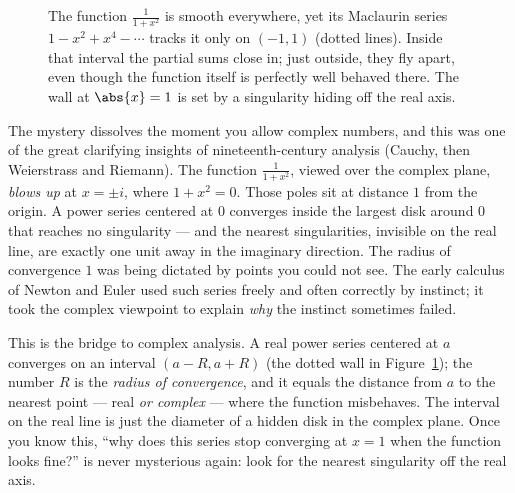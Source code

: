 \begin{figure}[H]
\centering
{}
\caption{The function $\frac{1}{1+x^2}$ is smooth everywhere, yet its Maclaurin series
$1-x^2+x^4-\cdots$ tracks it only on $(-1,1)$ (dotted lines). Inside that interval the
partial sums close in; just outside, they fly apart, even though the function itself is
perfectly well behaved there. The wall at $\abs{x}=1$ is set by a singularity hiding off
the real axis.}
\label{ch31:fig-geometric}
\end{figure}

\begin{historybox}
The mystery dissolves the moment you allow complex numbers, and this was one of the
great clarifying insights of nineteenth-century analysis (Cauchy, then
Weierstrass and Riemann). The function $\frac{1}{1+x^2}$, viewed over the complex
plane, \emph{blows up} at $x = \pm i$, where $1 + x^2 = 0$. Those poles sit at
distance $1$ from the origin. A power series centered at $0$ converges inside the
largest disk around $0$ that reaches no singularity --- and the nearest singularities,
invisible on the real line, are exactly one unit away in the imaginary direction. The
radius of convergence $1$ was being dictated by points you could not see. The early
calculus of Newton and Euler used such series freely and often correctly by
instinct; it took the complex viewpoint to explain \emph{why} the instinct sometimes
failed.
\end{historybox}

\begin{connectionbox}
This is the bridge to complex analysis. A real power series centered at $a$ converges
on an interval $(a-R, a+R)$ (the dotted wall in Figure~\ref{ch31:fig-geometric});
the number $R$ is the \emph{radius of convergence}, and
it equals the distance from $a$ to the nearest point --- real \emph{or complex} ---
where the function misbehaves. The interval on the real line is just the diameter of a
hidden disk in the complex plane. Once you know this, ``why does this series stop
converging at $x=1$ when the function looks fine?'' is never mysterious again: look
for the nearest singularity off the real axis.
\end{connectionbox}

